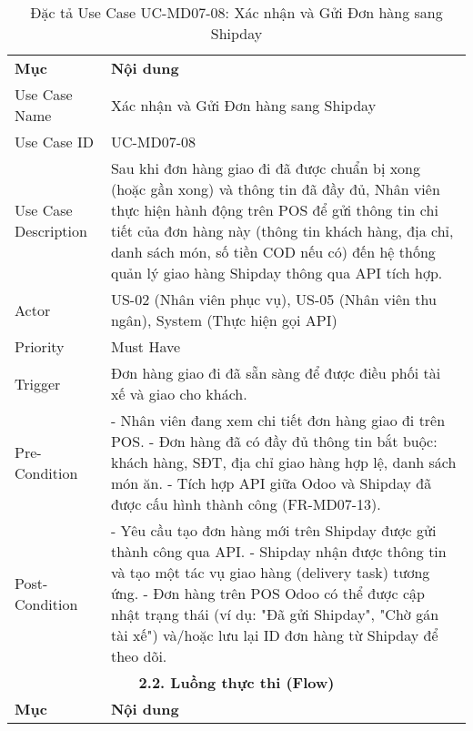 \begin{longtable}{|m{4cm}|p{11cm}|}
\caption{Đặc tả Use Case UC-MD07-08: Xác nhận và Gửi Đơn hàng sang Shipday} \label{tab:uc_md07_08} \\
\hline

\endhead %
\hline
\endfoot %
\hline
\endlastfoot %
\multicolumn{2}{|c|}{\textbf{2.1. Tóm tắt (Summary)}} \\
\hline
\textbf{Mục} & \textbf{Nội dung} \\
\hline
Use Case Name & Xác nhận và Gửi Đơn hàng sang Shipday \\
\hline
Use Case ID & UC-MD07-08 \\
\hline
Use Case Description & Sau khi đơn hàng giao đi đã được chuẩn bị xong (hoặc gần xong) và thông tin đã đầy đủ, Nhân viên thực hiện hành động trên POS để gửi thông tin chi tiết của đơn hàng này (thông tin khách hàng, địa chỉ, danh sách món, số tiền COD nếu có) đến hệ thống quản lý giao hàng Shipday thông qua API tích hợp. \\
\hline
Actor & US-02 (Nhân viên phục vụ), US-05 (Nhân viên thu ngân), System (Thực hiện gọi API) \\
\hline
Priority & Must Have \\
\hline
Trigger & Đơn hàng giao đi đã sẵn sàng để được điều phối tài xế và giao cho khách. \\
\hline
Pre-Condition & - Nhân viên đang xem chi tiết đơn hàng giao đi trên POS. \newline - Đơn hàng đã có đầy đủ thông tin bắt buộc: khách hàng, SĐT, địa chỉ giao hàng hợp lệ, danh sách món ăn. \newline - Tích hợp API giữa Odoo và Shipday đã được cấu hình thành công (FR-MD07-13). \\
\hline
Post-Condition & - Yêu cầu tạo đơn hàng mới trên Shipday được gửi thành công qua API. \newline - Shipday nhận được thông tin và tạo một tác vụ giao hàng (delivery task) tương ứng. \newline - Đơn hàng trên POS Odoo có thể được cập nhật trạng thái (ví dụ: "Đã gửi Shipday", "Chờ gán tài xế") và/hoặc lưu lại ID đơn hàng từ Shipday để theo dõi. \\
\hline
\multicolumn{2}{|c|}{\textbf{2.2. Luồng thực thi (Flow)}} \\
\hline
\textbf{Mục} & \textbf{Nội dung} \\
\hline

\end{longtable}
